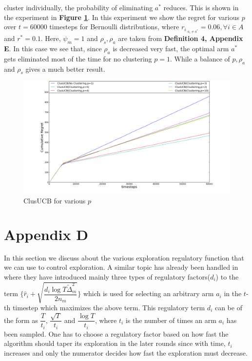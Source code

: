 \begin{remark}
cluster individually, the probability of eliminating $a^{*}$ reduces. This is shown in the experiment in \textbf{Figure \ref{Fig:variousClus}}. In this experiment we show the regret for various $p$ over $t=60000$ timesteps for Bernoulli distributions, where $r_{i_{:{a_{i}\neq a^{*}}}}=0.06,\forall i\in A$ and $r^{*}=0.1$. Here, $\psi_{m}=1$ and $\rho_{s},\rho_{a}$ are taken from \textbf{Definition 4, Appendix E}. In this case we see that, since $\rho_{a}$ is decreased very fast, the optimal arm $a^{*}$ gets eliminated most of the time for no clustering $p=1$. While a balance of $p,\rho_{a}$ and $\rho_{s}$ gives a much better result. 

\begin{figure}
\includegraphics[scale=0.3]{img/various_clus.png}
\caption{ClusUCB for various $p$}
\label{Fig:variousClus}
\end{figure}


     
\end{remark}

\section{Appendix D}

In this section we discuss about the various exploration regulatory function that we can use to control exploration. A similar topic has already been handled in \cite{liu2016modification} where they have introduced mainly three types of regulatory factors($d_{i}$) to the term $\bigg\lbrace\hat{r}_{i}+\sqrt{\dfrac{d_{i}\log T\tilde{\Delta}_{m}^{2}}{2n_{m}}}\bigg\rbrace$ which is used for selecting an arbitrary arm $a_{i}$ in the $t$-th timestep which maximizes the above term. This regulatory term $d_{i}$ can be of the form as $\dfrac{T}{t_{i}}$, $\dfrac{\sqrt{T}}{t_{i}}$ and $\dfrac{\log T}{t_{i}}$, where $t_{i}$ is the number of times an arm $a_{i}$ has been sampled. One has to choose a regulatory factor based on how fast the algorithm should taper its exploration in the later rounds since with time, $t_{i}$ increases and only the numerator decides how fast the exploration must decrease.

